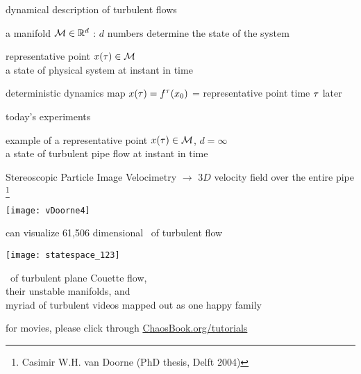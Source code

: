 \begin{frame}{dynamical description of turbulent flows}

\begin{block}{\statesp}
a manifold ${\cal M} \in \mathbb{R}^{d}$ :
$d$ numbers determine the state of the system
\end{block}

\bigskip

\begin{block}{representative point }
$x(\tau) \in {\cal M}$
\\
a state of physical system at instant in time
\end{block}

\bigskip

\begin{block}{deterministic dynamics}
map $x(\tau) = {f^{\tau}({x_0})}$ =
representative point time $\tau$ later
\end{block}
\end{frame}

\begin{frame}{today's experiments}
\begin{block}{example of a representative point }
$x(\tau) \in {\cal M}$, $d= \infty$ \\
a state of turbulent pipe flow at instant in time
\end{block}

\bigskip

Stereoscopic Particle Image Velocimetry $\to$
$3D$ velocity field over the entire pipe%
\footnote{
Casimir W.H. van Doorne
(PhD thesis, Delft  2004)
}

\bigskip

\begin{center}
\texttt{[image: vDoorne4]}
\end{center}
\end{frame}

\begin{frame}{can visualize 61,506 dimensional \statesp\ of turbulent flow}
\begin{center}
\texttt{[image: statespace\_123]}
\end{center}
\eqva\ of turbulent plane Couette flow,
\\
their unstable manifolds, and
\\
myriad of turbulent videos mapped out as one happy family

\bigskip

\hfill   {\small
          for movies, please click through
            \textcolor{blue}{\href{http://ChaosBook.org/tutorials}
             {ChaosBook.org/tutorials}}
          }
\end{frame}


